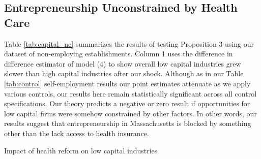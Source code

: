 \documentclass[12pt]{article}
\begin{document}
\subsection{Entrepreneurship Unconstrained by Health Care}

Table \ref{tab:capital_ne} summarizes the results of testing Proposition 3 using our dataset of non-employing establishments. Column 1 uses the difference in difference estimator of model (4) to show overall low capital industries grew slower than high capital industries after our shock. Although as in our Table \ref{tab:control} self-employment results our point estimates attenuate as we apply various controls, our results here remain statistically significant across all control specifications. Our theory predicts a negative or zero result if opportunities for low capital firms were somehow constrained by other factors. In other words, our results suggest that entrepreneurship in Massachusetts is blocked by something other than the lack access to health insurance. 


\begin{comment}
We next turn to Proposition 4 which provides us with more statistical accuracy if the shock's impact was short lived. Column 2 of table \ref{tab:capital_ne_ext} shows a significant effect under the triple difference model of model (7) with other New England states as a control. The result is not robust to other controls as we see in Column 3 and Column 4. 
\end{comment}

\begin{table}[H]
    \footnotesize
	\centering
	\caption{Impact of health reform on low capital industries}
	
	\label{tab:capital_ne}
\end{table} 
\end{document}
